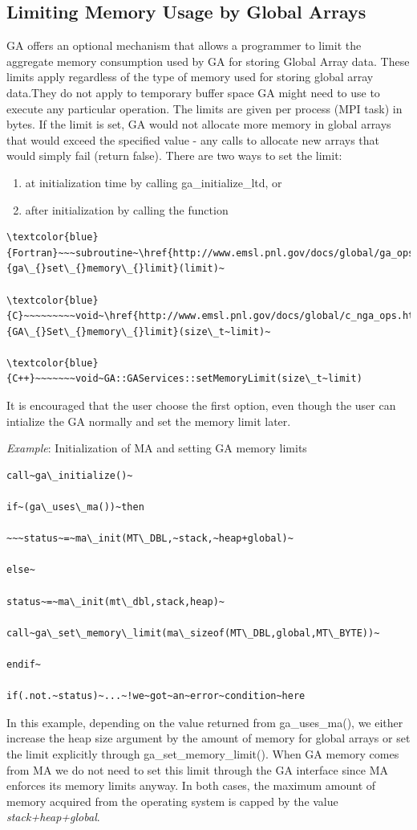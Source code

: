 \subsection{Limiting Memory Usage by Global Arrays }

GA offers an optional mechanism that allows a programmer to limit
the aggregate memory consumption used by GA for storing Global Array
data. These limits apply regardless of the type of memory used for
storing global array data.They do not apply to temporary buffer space
GA might need to use to execute any particular operation. The limits
are given per process (MPI task) in bytes. If the limit is set, GA
would not allocate more memory in global arrays that would exceed
the specified value - any calls to allocate new arrays that would
simply fail (return false). There are two ways to set the limit:
\begin{enumerate}
\item at initialization time by calling ga\_initialize\_ltd, or 
\item after initialization by calling the function\end{enumerate}
\begin{verbatim}
\textcolor{blue}{Fortran}~~~subroutine~\href{http://www.emsl.pnl.gov/docs/global/ga_ops.html\#ga_set_memory_limit}{ga\_{}set\_{}memory\_{}limit}(limit)~

\textcolor{blue}{C}~~~~~~~~~void~\href{http://www.emsl.pnl.gov/docs/global/c_nga_ops.html\#ga_set_memory_limit}{GA\_{}Set\_{}memory\_{}limit}(size\_t~limit)~

\textcolor{blue}{C++}~~~~~~~void~GA::GAServices::setMemoryLimit(size\_t~limit)
\end{verbatim}
It is encouraged that the user choose the first option, even though
the user can intialize the GA normally and set the memory limit later.

\emph{Example}: Initialization of MA and setting GA memory limits
\begin{verbatim}
call~ga\_initialize()~

if~(ga\_uses\_ma())~then

~~~status~=~ma\_init(MT\_DBL,~stack,~heap+global)~

else~

status~=~ma\_init(mt\_dbl,stack,heap)~

call~ga\_set\_memory\_limit(ma\_sizeof(MT\_DBL,global,MT\_BYTE))~

endif~

if(.not.~status)~...~!we~got~an~error~condition~here
\end{verbatim}
In this example, depending on the value returned from ga\_uses\_ma(),
we either increase the heap size argument by the amount of memory
for global arrays or set the limit explicitly through ga\_set\_memory\_limit().
When GA memory comes from MA we do not need to set this limit through
the GA interface since MA enforces its memory limits anyway. In both
cases, the maximum amount of memory acquired from the operating system
is capped by the value \emph{stack+heap+global}. 


